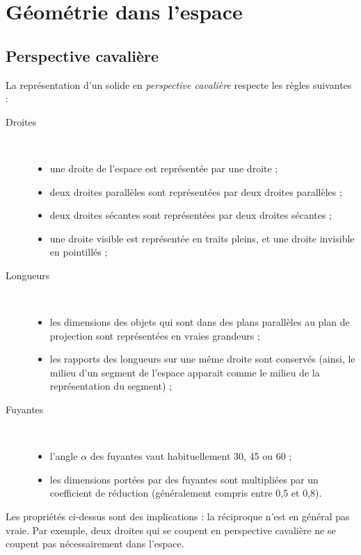 \chapter{Géométrie dans l'espace}
\section{Perspective cavalière}

\begin{desc}
  La représentation d'un solide en \emph{perspective cavalière} respecte les règles suivantes :
  \begin{description}
    \item[Droites]~
      \begin{itemize}
        \item une droite de l'espace est représentée par une droite ;
        \item deux droites parallèles sont représentées par deux droites parallèles ;
        \item deux droites sécantes sont représentées par deux droites sécantes ;
        \item une droite visible est représentée en traits pleins, et une droite invisible en pointillés ;
      \end{itemize}
    \item[Longueurs]~
      \begin{itemize}
        \item les dimensions des objets qui sont dans des plans parallèles au plan de projection sont représentées en vraies grandeurs ;
        \item les rapports des longueurs sur une même droite sont conservés (ainsi, le milieu d'un segment de l'espace apparait comme le milieu de la représentation du segment) ;
      \end{itemize}
    \item[Fuyantes]~
      \begin{itemize}
        \item l'angle $\alpha$ des fuyantes vaut habituellement 30, 45 ou 60 ;
        \item les dimensions portées par des fuyantes sont multipliées par un coefficient de réduction (généralement compris entre 0,5 et 0,8).
      \end{itemize}
  \end{description}
\end{desc}

\begin{remarque}
  Les propriétés ci-dessus sont des implications : la réciproque n'est en général pas vraie. Par exemple, deux droites qui se coupent en perspective cavalière ne se coupent pas nécessairement dans l'espace.
\end{remarque}



